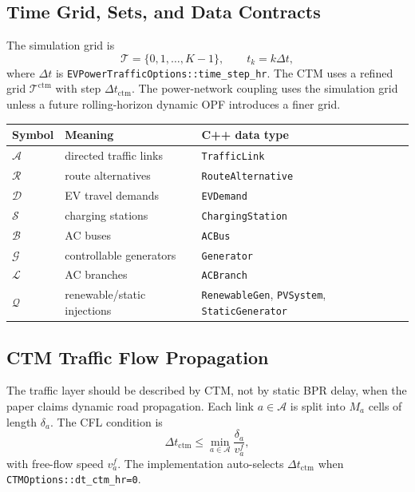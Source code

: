 \subsection{Time Grid, Sets, and Data Contracts}
\label{sec:evpt-sets}

The simulation grid is
\[
  \mathcal{T}=\{0,1,\ldots,K-1\},\qquad t_k=k\Delta t,
\]
where \(\Delta t\) is \texttt{EVPowerTrafficOptions::time\_step\_hr}. The CTM
uses a refined grid \(\mathcal{T}^{\mathrm{ctm}}\) with step
\(\Delta t_{\mathrm{ctm}}\). The power-network coupling uses the simulation
grid unless a future rolling-horizon dynamic OPF introduces a finer grid.

\begin{center}
\begin{tabular}{lll}
\toprule
\textbf{Symbol} & \textbf{Meaning} & \textbf{C++ data type} \\
\midrule
\(\mathcal{A}\) & directed traffic links & \texttt{TrafficLink} \\
\(\mathcal{R}\) & route alternatives & \texttt{RouteAlternative} \\
\(\mathcal{D}\) & EV travel demands & \texttt{EVDemand} \\
\(\mathcal{S}\) & charging stations & \texttt{ChargingStation} \\
\(\mathcal{B}\) & AC buses & \texttt{ACBus} \\
\(\mathcal{G}\) & controllable generators & \texttt{Generator} \\
\(\mathcal{L}\) & AC branches & \texttt{ACBranch} \\
\(\mathcal{Q}\) & renewable/static injections & \texttt{RenewableGen}, \texttt{PVSystem}, \texttt{StaticGenerator} \\
\bottomrule
\end{tabular}
\end{center}

\subsection{CTM Traffic Flow Propagation}
\label{sec:evpt-traffic}

The traffic layer should be described by CTM, not by static BPR delay, when the
paper claims dynamic road propagation. Each link \(a\in\mathcal{A}\) is split
into \(M_a\) cells of length \(\delta_a\). The CFL condition is
\begin{equation}
  \Delta t_{\mathrm{ctm}} \le \min_{a\in\mathcal{A}} \frac{\delta_a}{v^f_a},
  \label{eq:evpt-cfl}
\end{equation}
with free-flow speed \(v^f_a\). The implementation auto-selects
\(\Delta t_{\mathrm{ctm}}\) when \texttt{CTMOptions::dt\_ctm\_hr=0}.

